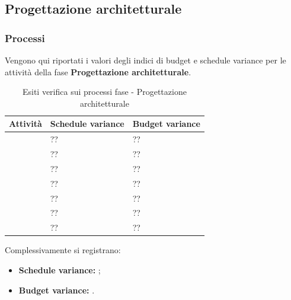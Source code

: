 		\subsection{Progettazione architetturale}
		\subsubsection{Processi}
		Vengono qui riportati i valori degli indici di budget e schedule variance per le attività della fase \textbf{Progettazione architetturale}.
			\begin{table}[!ht]
			\begin{center}
				\begin{tabularx}{0.9\textwidth}{|l|l|X|}
					\hline
					\textbf{Attività} & \textbf{Schedule variance} & \textbf{Budget variance}\\
					\hline						
					\docNameVersionAdR & ?? & ??\\
					\hline
					\docNameVersionGlo & ?? & ??\\
					\hline					
					\docNameVersionNdP & ?? & ??\\
					\hline					
					\docNameVersionPdP & ?? & ??\\
					\hline					
					\docNameVersionPdQ & ?? & ??\\
					\hline					
					\docNameVersionSdF & ?? & ??\\
					\hline		
					\docNameVersionST & ?? & ??\\
					\hline		
				\end{tabularx}
			\end{center}
		\caption{Esiti verifica sui processi fase - Progettazione architetturale}
	\end{table}
	Complessivamente si registrano:
	\begin{itemize}
	\item \textbf{Schedule variance:} ;
	\item \textbf{Budget variance:} .
	\end{itemize}

